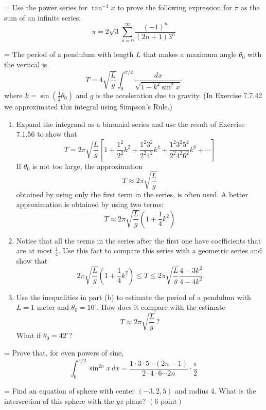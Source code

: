 \documentclass[a4paper,12pt,twocolumn]{article}
\newlength{\problemnumberwidth}
\newcommand{\problem}[2]{%
  \par\noindent
  \hangindent=\problemnumberwidth
  \hangafter=1
  \makebox[\problemnumberwidth][l]{\textbf{#1.}}#2\par
  \vspace{1.4em}%
}
\begin{document}
\problem{49}{Use the power series for \(\tan^{-1}x\) to prove the following expression for \(\pi\) as the sum of an infinite series:
\[
\pi = 2\sqrt{3}\sum_{n=0}^{\infty}\frac{(-1)^n}{(2n+1)3^n}
\]}

\problem{38}{The period of a pendulum with length \(L\) that makes a maximum angle \(\theta_0\) with the vertical is
\[
T = 4\sqrt{\frac{L}{g}} \int_0^{\pi/2} \frac{dx}{\sqrt{1-k^2\sin^2 x}}
\]
where \(k=\sin\left(\frac{1}{2}\theta_0\right)\) and \(g\) is the acceleration due to gravity.
(In Exercise 7.7.42 we approximated this integral using Simpson's Rule.)
\begin{enumerate}[label=(\alph*), leftmargin=2em]
\item Expand the integrand as a binomial series and use the result of Exercise 7.1.56 to show that
\[
T = 2\pi\sqrt{\frac{L}{g}}
\left[
1+\frac{1^2}{2^2}k^2+\frac{1^2 3^2}{2^2 4^2}k^4+\frac{1^2 3^2 5^2}{2^2 4^2 6^2}k^6+\cdots
\right]
\]
If \(\theta_0\) is not too large, the approximation
\[
T \approx 2\pi\sqrt{\frac{L}{g}}
\]
obtained by using only the first term in the series, is often used. A better approximation is obtained by using two terms:
\[
T \approx 2\pi\sqrt{\frac{L}{g}}\left(1+\frac{1}{4}k^2\right)
\]
\item Notice that all the terms in the series after the first one have coefficients that are at most \(\frac{1}{4}\). Use this fact to compare this series with a geometric series and show that
\[
2\pi\sqrt{\frac{L}{g}}\left(1+\frac{1}{4}k^2\right)
\leq
T
\leq
2\pi\sqrt{\frac{L}{g}}\frac{4-3k^2}{4-4k^2}
\]
\item Use the inequalities in part (b) to estimate the period of a pendulum with \(L=1\) meter and \(\theta_0=10^\circ\). How does it compare with the estimate
\[
T \approx 2\pi\sqrt{\frac{L}{g}} \, ?
\]
What if \(\theta_0=42^\circ\)?
\end{enumerate}}

\problem{7.1.56}{Prove that, for even powers of sine,
\[
\int_0^{\pi/2}\sin^{2n}x\,dx
=
\frac{1\cdot 3\cdot 5\cdots(2n-1)}{2\cdot 4\cdot 6\cdots 2n}\cdot\frac{\pi}{2}
\]}

\problem{3}{Find an equation of sphere with center \((-3,2,5)\) and radius \(4\). What is the intersection of this sphere with the \(yz\)-plane?
\((6\text{ point})\)}
\end{document}
